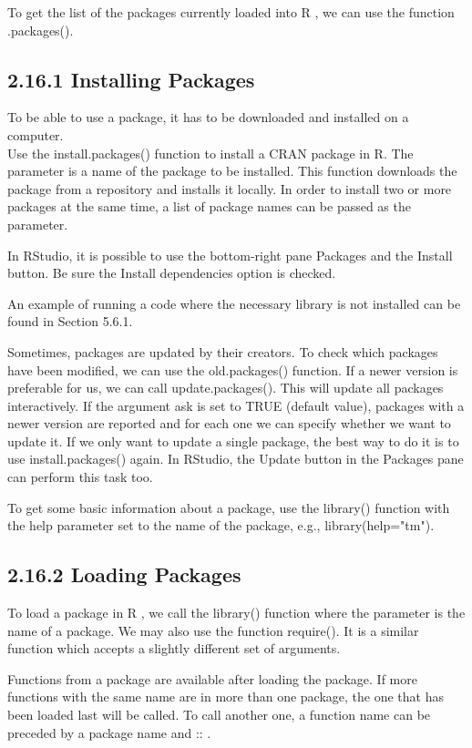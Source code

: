 \documentclass[10pt]{book}
\begin{document}
To get the list of the packages currently loaded into R , we can use the function .packages().

\subsection*{2.16.1 Installing Packages}
To be able to use a package, it has to be downloaded and installed on a computer.\\
Use the install.packages() function to install a CRAN package in R. The parameter is a name of the package to be installed. This function downloads the package from a repository and installs it locally. In order to install two or more packages at the same time, a list of package names can be passed as the parameter.

In RStudio, it is possible to use the bottom-right pane Packages and the Install button. Be sure the Install dependencies option is checked.

An example of running a code where the necessary library is not installed can be found in Section 5.6.1.

Sometimes, packages are updated by their creators. To check which packages have been modified, we can use the old.packages() function. If a newer version is preferable for us, we can call update.packages(). This will update all packages interactively. If the argument ask is set to TRUE (default value), packages with a newer version are reported and for each one we can specify whether we want to update it. If we only want to update a single package, the best way to do it is to use install.packages() again. In RStudio, the Update button in the Packages pane can perform this task too.

To get some basic information about a package, use the library() function with the help parameter set to the name of the package, e.g., library(help="tm").

\subsection*{2.16.2 Loading Packages}
To load a package in R , we call the library() function where the parameter is the name of a package. We may also use the function require(). It is a similar function which accepts a slightly different set of arguments.

Functions from a package are available after loading the package. If more functions with the same name are in more than one package, the one that has been loaded last will be called. To call another one, a function name can be preceded by a package name and :: .
\end{document}
